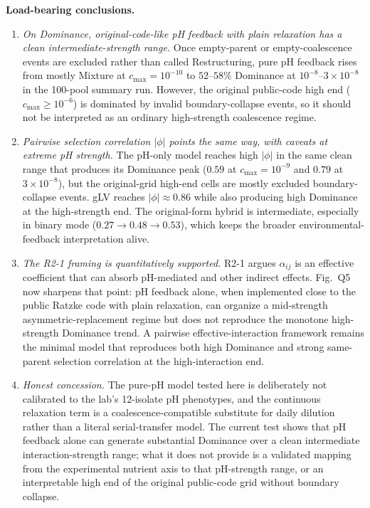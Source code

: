 \documentclass[11pt]{article}
\begin{document}
\noindent\textbf{Load-bearing conclusions.}

\begin{enumerate}[itemsep=2pt]
    \item \emph{On Dominance, original-code-like pH feedback with plain relaxation has a clean intermediate-strength range.} Once empty-parent or empty-coalescence events are excluded rather than called Restructuring, pure pH feedback rises from mostly Mixture at $c_{\max}=10^{-10}$ to $52$--$58\%$ Dominance at $10^{-8}$--$3\times10^{-8}$ in the 100-pool summary run. However, the original public-code high end ($c_{\max}\ge10^{-6}$) is dominated by invalid boundary-collapse events, so it should not be interpreted as an ordinary high-strength coalescence regime.
    \item \emph{Pairwise selection correlation $|\phi|$ points the same way, with caveats at extreme pH strength.} The pH-only model reaches high $|\phi|$ in the same clean range that produces its Dominance peak ($0.59$ at $c_{\max}=10^{-9}$ and $0.79$ at $3\times10^{-8}$), but the original-grid high-end cells are mostly excluded boundary-collapse events. gLV reaches $|\phi| \approx 0.86$ while also producing high Dominance at the high-strength end. The original-form hybrid is intermediate, especially in binary mode ($0.27 \to 0.48 \to 0.53$), which keeps the broader environmental-feedback interpretation alive.
    \item \emph{The R2-1 framing is quantitatively supported.} R2-1 argues $\alpha_{ij}$ is an effective coefficient that can absorb pH-mediated and other indirect effects. Fig.~Q5 now sharpens that point: pH feedback alone, when implemented close to the public Ratzke code with plain relaxation, can organize a mid-strength asymmetric-replacement regime but does not reproduce the monotone high-strength Dominance trend. A pairwise effective-interaction framework remains the minimal model that reproduces both high Dominance and strong same-parent selection correlation at the high-interaction end.
    \item \emph{Honest concession.} The pure-pH model tested here is deliberately not calibrated to the lab's 12-isolate pH phenotypes, and the continuous relaxation term is a coalescence-compatible substitute for daily dilution rather than a literal serial-transfer model. The current test shows that pH feedback alone can generate substantial Dominance over a clean intermediate interaction-strength range; what it does not provide is a validated mapping from the experimental nutrient axis to that pH-strength range, or an interpretable high end of the original public-code grid without boundary collapse.
\end{enumerate}
\end{document}
